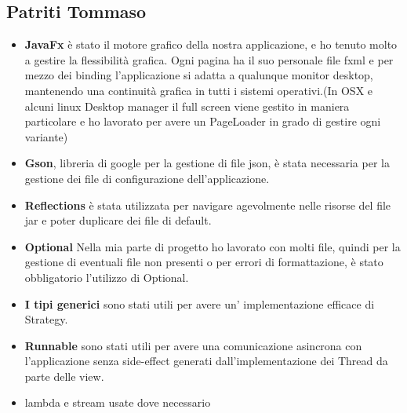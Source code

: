 \documentclass[a4paper,12pt]{report}
\begin{document}
\subsection{Patriti Tommaso}
\begin{itemize}
\item \textbf{JavaFx} è stato il motore grafico della nostra applicazione, e ho tenuto molto a gestire la flessibilità grafica. Ogni pagina ha il suo personale file fxml e per mezzo dei binding l'applicazione si adatta a qualunque monitor desktop, mantenendo una continuità grafica in tutti i sistemi operativi.(In OSX e alcuni linux Desktop manager il full screen viene gestito in maniera particolare e ho lavorato per avere un PageLoader in grado di gestire ogni variante)
\item \textbf{Gson}, libreria di google per la gestione di file json, è stata necessaria per la gestione dei file di configurazione dell'applicazione.
\item \textbf{Reflections} è stata utilizzata per navigare agevolmente nelle risorse del file jar e poter duplicare dei file di default.
\item \textbf{Optional} Nella mia parte di progetto ho lavorato con molti file, quindi per la gestione di eventuali file non presenti o per errori di formattazione, è stato obbligatorio l'utilizzo di Optional.
\item \textbf{I tipi generici} sono stati utili per avere un' implementazione efficace di Strategy.
\item \textbf{Runnable} sono stati utili per avere una comunicazione asincrona con l'applicazione senza side-effect generati dall'implementazione dei Thread da parte delle view.
\item lambda e stream usate dove necessario
\end{itemize}
\end{document}
